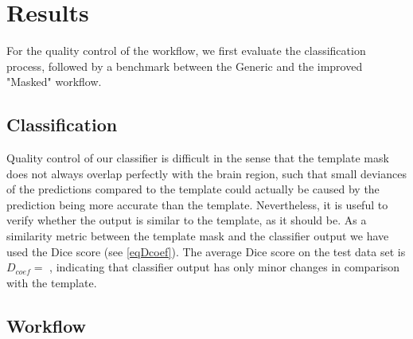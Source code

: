\section{Results}
For the quality control of the workflow, we first evaluate the classification process, followed by a benchmark between the Generic and the improved "Masked" workflow.

\subsection{Classification}
Quality control of our classifier is difficult in the sense that the template mask does not always overlap perfectly with the brain region, such that small deviances of the predictions compared to the template could actually be caused by the prediction being more accurate than the template.
Nevertheless, it is useful to verify whether the output is similar to the template, as it should be.
As a similarity metric between the template mask and the classifier output we have used the Dice score (see \cref{eqDcoef}).
The average Dice score on the test data set is $D_{coef}= $
, indicating that classifier output has only minor changes in comparison with the template.



\subsection{Workflow}

